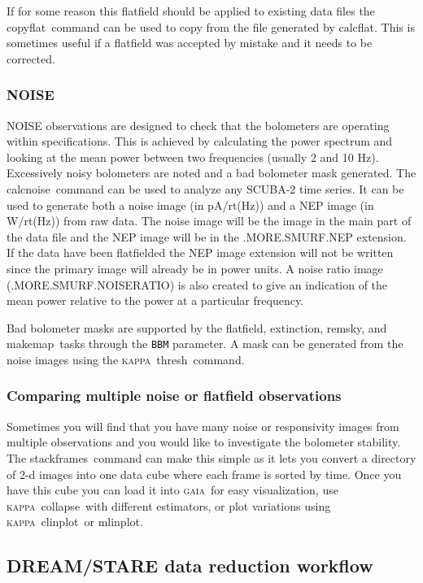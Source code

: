 \documentclass[twoside,11pt]{article}
\newcommand{\xref}[3]{#1}
\newcommand{\xlabel}[1]{}
\renewcommand{\_}{\texttt{\symbol{95}}}
\newcommand{\GAIA}{\textsc{gaia}}
\newcommand{\KAPPA}{\textsc{kappa}}
\newcommand{\task}[1]{\textsf{#1}}
\newcommand{\calcflat}{\xref{\task{calcflat}}{sun258}{CALCFLAT}}
\newcommand{\calcnoise}{\xref{\task{calcnoise}}{sun258}{CALCNOISE}}
\newcommand{\copyflat}{\xref{\task{copyflat}}{sun258}{COPYFLAT}}
\newcommand{\stackframes}{\xref{\task{stackframes}}{sun258}{STACKFRAMES}}
\newcommand{\extinction}{\xref{\task{extinction}}{sun258}{EXTINCTION}}
\newcommand{\flatfield}{\xref{\task{flatfield}}{sun258}{FLATFIELD}}
\newcommand{\makemap}{\xref{\task{makemap}}{sun258}{MAKEMAP}}
\newcommand{\remsky}{\xref{\task{remsky}}{sun258}{REMSKY}}
\newcommand{\clinplot}{\xref{\task{clinplot}}{sun95}{CLINPLOT}}
\newcommand{\mlinplot}{\xref{\task{mlinplot}}{sun95}{MLINPLOT}}
\newcommand{\collapse}{\xref{\task{collapse}}{sun95}{COLLAPSE}}
\newcommand{\thresh}{\xref{\task{thresh}}{sun95}{THRESH}}
\newcommand{\aparam}[1]{\texttt{#1}}     %
\begin{document}
If for some reason this flatfield should be applied to existing data
files the \copyflat\ command can be used to copy from the file
generated by \calcflat. This is sometimes useful if a flatfield was
accepted by mistake and it needs to be corrected.

\subsubsection{NOISE}

NOISE observations are designed to check that the bolometers are
operating within specifications. This is achieved by calculating the
power spectrum and looking at the mean power between two frequencies
(usually 2 and 10 Hz). Excessively noisy bolometers are noted and a bad
bolometer mask generated.  The \calcnoise\ command can be used to
analyze any SCUBA-2 time series. It can be used to generate both a
noise image (in pA/rt(Hz)) and a NEP image (in W/rt(Hz)) from raw
data. The noise image will be the image in the main part of the data
file and the NEP image will be in the .MORE.SMURF.NEP extension. If
the data have been flatfielded the NEP image extension will not be
written since the primary image will already be in power units. A
noise ratio image (.MORE.SMURF.NOISERATIO) is also created to give an
indication of the mean power relative to the power at a particular frequency.

Bad bolometer masks are supported by the \flatfield, \extinction,
\remsky, and \makemap\ tasks through the \aparam{BBM}
parameter. A mask can be generated from the noise images using the
\KAPPA\ \thresh\ command.

\subsubsection{Comparing multiple noise or flatfield observations}

Sometimes you will find that you have many noise or responsivity
images from multiple observations and you would like to investigate the
bolometer stability. The \stackframes\ command can make this simple as
it lets you convert a directory of 2-d images into one data cube where
each frame is sorted by time. Once you have this cube you can load it
into \GAIA\ for easy visualization, use \KAPPA\ \collapse\ with
different estimators, or plot variations using \KAPPA\ \clinplot\ or \mlinplot.

\subsection{\xlabel{dsworkflow}DREAM/STARE data reduction workflow\label{se:dsworkflow}}
\end{document}
